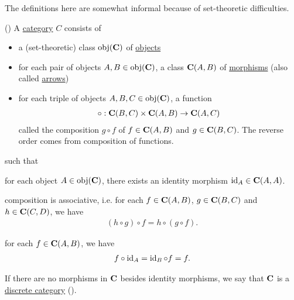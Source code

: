 \begin{note}
  The definitions here are somewhat informal because of set-theoretic difficulties.
\end{note}

\begin{definition}\label{def:category}(\cite[definition 1.1.1]{Leinster2014})
  A \uline{category} $C$ consists of
  \begin{itemize}
    \item a (set-theoretic) class $\operatorname{obj}(\operatorname{\mathbf{C}})$ of \uline{objects}
    \item for each pair of objects $A, B \in \operatorname{obj}(\operatorname{\mathbf{C}})$, a class ${\operatorname{\mathbf{C}}}(A, B)$ of \uline{morphisms} (also called \uline{arrows})
    \item for each triple of objects $A, B, C \in \operatorname{obj}(\operatorname{\mathbf{C}})$, a function
    \begin{align*}
      \circ: {\operatorname{\mathbf{C}}}(B, C) \times {\operatorname{\mathbf{C}}}(A, B) \to {\operatorname{\mathbf{C}}}(A, C)
    \end{align*}
    called the composition $g \circ f$ of $f \in {\operatorname{\mathbf{C}}}(A, B)$ and $g \in {\operatorname{\mathbf{C}}}(B, C)$. The reverse order comes from composition of functions.
  \end{itemize}
  such that
  \begin{defenum}
    \item for each object $A \in \operatorname{obj}(\operatorname{\mathbf{C}})$, there exists an identity morphism $\operatorname{id}_A \in {\operatorname{\mathbf{C}}}(A, A)$.
    \item composition is associative, i.e. for each $f \in {\operatorname{\mathbf{C}}}(A, B)$, $g \in {\operatorname{\mathbf{C}}}(B, C)$ and $h \in {\operatorname{\mathbf{C}}}(C, D)$, we have
    \begin{align*}
      (h \circ g) \circ f = h \circ (g \circ f).
    \end{align*}
    \item for each $f \in {\operatorname{\mathbf{C}}}(A, B)$, we have
    \begin{align*}
      f \circ \operatorname{id}_A = \operatorname{id}_B \circ f = f.
    \end{align*}
  \end{defenum}

  If there are no morphisms in $\operatorname{\mathbf{C}}$ besides identity morphisms, we say that $\operatorname{\mathbf{C}}$ is a \uline{discrete category} (\cite[example 1.1.18(b)]{Leinster2014}).
\end{definition}

